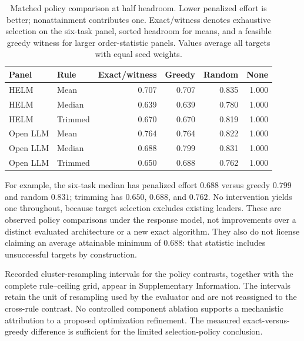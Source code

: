 \documentclass{article}
\begin{document}
\begin{table}[t]
\centering
\caption{Matched policy comparison at half headroom. Lower penalized effort is better; nonattainment contributes one. Exact/witness denotes exhaustive selection on the six-task panel, sorted headroom for means, and a feasible greedy witness for larger order-statistic panels. Values average all targets with equal seed weights.}
\label{tab:policies}
\begin{tabular}{llrrrr}
\toprule
Panel & Rule & Exact/witness & Greedy & Random & None\\
\midrule
HELM & Mean & 0.707 & 0.707 & 0.835 & 1.000 \\
HELM & Median & 0.639 & 0.639 & 0.780 & 1.000 \\
HELM & Trimmed & 0.670 & 0.670 & 0.819 & 1.000 \\
Open LLM & Mean & 0.764 & 0.764 & 0.822 & 1.000 \\
Open LLM & Median & 0.688 & 0.799 & 0.831 & 1.000 \\
Open LLM & Trimmed & 0.650 & 0.688 & 0.762 & 1.000 \\
\bottomrule
\end{tabular}
\end{table}

For example, the six-task median has penalized effort $0.688$ versus greedy $0.799$ and random $0.831$; trimming has $0.650$, $0.688$, and $0.762$. No intervention yields one throughout, because target selection excludes existing leaders. These are observed policy comparisons under the response model, not improvements over a distinct evaluated architecture or a new exact algorithm. They also do not license claiming an average attainable minimum of $0.688$: that statistic includes unsuccessful targets by construction.

Recorded cluster-resampling intervals for the policy contrasts, together with the complete rule--ceiling grid, appear in Supplementary Information. The intervals retain the unit of resampling used by the evaluator and are not reassigned to the cross-rule contrast. No controlled component ablation supports a mechanistic attribution to a proposed optimization refinement. The measured exact-versus-greedy difference is sufficient for the limited selection-policy conclusion.
\end{document}
